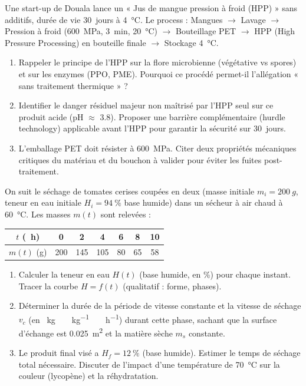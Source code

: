\documentclass[11pt]{article}
\begin{document}
\begin{exercice}
Une start-up de Douala lance un « Jus de mangue pression à froid (HPP) » sans additifs, durée de vie \SI{30}{jours} à \SI{4}{\celsius}. Le process : Mangues $\rightarrow$ Lavage $\rightarrow$ Pression à froid (\SI{600}{MPa}, \SI{3}{\minute}, \SI{20}{\celsius}) $\rightarrow$ Bouteillage PET $\rightarrow$ HPP (High Pressure Processing) en bouteille finale $\rightarrow$ Stockage \SI{4}{\celsius}.
\begin{enumerate}
    \item Rappeler le principe de l'HPP sur la flore microbienne (végétative vs spores) et sur les enzymes (PPO, PME). Pourquoi ce procédé permet-il l'allégation « sans traitement thermique » ?
    \item Identifier le danger résiduel majeur non maîtrisé par l'HPP seul sur ce produit acide (pH $\approx$ \num{3.8}). Proposer une barrière complémentaire (hurdle technology) applicable avant l'HPP pour garantir la sécurité sur \SI{30}{jours}.
    \item L'emballage PET doit résister à \SI{600}{MPa}. Citer deux propriétés mécaniques critiques du matériau et du bouchon à valider pour éviter les fuites post-traitement.
\end{enumerate}
\end{exercice}

\begin{exercice}
On suit le séchage de tomates cerises coupées en deux (masse initiale $m_i = \SI{200}{g}$, teneur en eau initiale $H_i = \SI{94}{\%}$ base humide) dans un sécheur à air chaud à \SI{60}{\celsius}. Les masses $m(t)$ sont relevées :
\begin{center}
\begin{tabular}{|c|c|c|c|c|c|c|}
\hline
$t$ (\SI{}{\hour}) & 0 & 2 & 4 & 6 & 8 & 10 \\
\hline
$m(t)$ (g) & 200 & 145 & 105 & 80 & 65 & 58 \\
\hline
\end{tabular}
\end{center}
\begin{enumerate}
    \item Calculer la teneur en eau $H(t)$ (base humide, en \%) pour chaque instant. Tracer la courbe $H = f(t)$ (qualitatif : forme, phases).
    \item Déterminer la durée de la période de vitesse constante et la vitesse de séchage $v_c$ (en \SI{}{\kilogram\ \per\kilogram\ \per\hour}) durant cette phase, sachant que la surface d'échange est \SI{0.025}{\meter\squared} et la matière sèche $m_s$ constante.
    \item Le produit final visé a $H_f = \SI{12}{\%}$ (base humide). Estimer le temps de séchage total nécessaire. Discuter de l'impact d'une température de \SI{70}{\celsius} sur la couleur (lycopène) et la réhydratation.
\end{enumerate}
\end{exercice}
\end{document}
